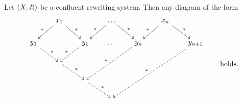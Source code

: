 \begin{lemma} \label{confluenceInduction}
Let $\sSet{X,R}$ be a confluent rewriting system. Then any diagram of the form
\[ \begin{tikzcd}[column sep=1.8em]
{} & x_1 \arrow[dl, swap, "{*}"] \arrow[dr, "{*}"] & {} & \arrow[dl, swap, "{*}"]\arrow[dr, "{*}"] \hdots & {} & x_n \arrow[dl, swap, "{*}"] \arrow[dr, "{*}"] & {} \\
y_0 \arrow[dr, dashed, "{*}"] & {} & \arrow[dl, swap, dashed, "{*}"] y_1 & \hdots & \arrow[ddll, swap, dashed, "{*}"] y_n  & {} & \arrow[dddlll, swap, dashed, "{*}"] y_{n+1} \\
{} & {} \arrow[dr, dashed, "{*}"] & {} &  {}  & {} &  {} & {} \\
{} & {} & {} \arrow[dr, dashed, "{*}"] & {} & {} & {} & {} \\
{} & {} & {} & {} & {} & {} & {} \\
\end{tikzcd} \qquad \text{holds.} \]
\end{lemma}

